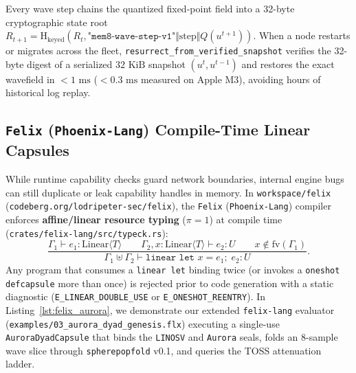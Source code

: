 \documentclass[10pt,twocolumn,letterpaper]{article}
\begin{document}
Every wave step chains the quantized fixed-point field into a 32-byte cryptographic state root $R_{t+1} = \text{H}_{\text{keyed}}(R_t, \texttt{"mem8-wave-step-v1"} \Vert \text{step} \Vert Q(u^{t+1}))$. When a node restarts or migrates across the fleet, \texttt{resurrect\_from\_verified\_snapshot} verifies the 32-byte digest of a serialized $32\text{ KiB}$ snapshot $(u^t, u^{t-1})$ and restores the exact wavefield in \textbf{$< 1\text{ ms}$} ($< 0.3\text{ ms}$ measured on Apple M3), avoiding hours of historical log replay.

\subsection{\texttt{Felix} (\texttt{Phoenix-Lang}) Compile-Time Linear Capsules}
While runtime capability checks guard network boundaries, internal engine bugs can still duplicate or leak capability handles in memory. In \texttt{workspace/felix} (\texttt{codeberg.org/lodripeter-sec/felix}), the \texttt{Felix} (\texttt{Phoenix-Lang}) compiler enforces \textbf{affine/linear resource typing} ($\pi = 1$) at compile time (\texttt{crates/felix-lang/src/typeck.rs}):
\begin{equation}
    \frac{\Gamma_1 \vdash e_1 : \text{Linear}\langle T \rangle \qquad \Gamma_2, x : \text{Linear}\langle T \rangle \vdash e_2 : U \qquad x \notin \text{fv}(\Gamma_1)}{\Gamma_1 \uplus \Gamma_2 \vdash \texttt{linear let } x = e_1;\; e_2 : U}.
\end{equation}
Any program that consumes a \texttt{linear let} binding twice (or invokes a \texttt{oneshot defcapsule} more than once) is rejected prior to code generation with a static diagnostic (\texttt{E\_LINEAR\_DOUBLE\_USE} or \texttt{E\_ONESHOT\_REENTRY}). In Listing~\ref{lst:felix_aurora}, we demonstrate our extended \texttt{felix-lang} evaluator (\texttt{examples/03\_aurora\_dyad\_genesis.flx}) executing a single-use \texttt{AuroraDyadCapsule} that binds the \texttt{LINOSV} and \texttt{Aurora} seals, folds an 8-sample wave slice through \texttt{spherepopfold} v0.1, and queries the TOSS attenuation ladder.
\end{document}
